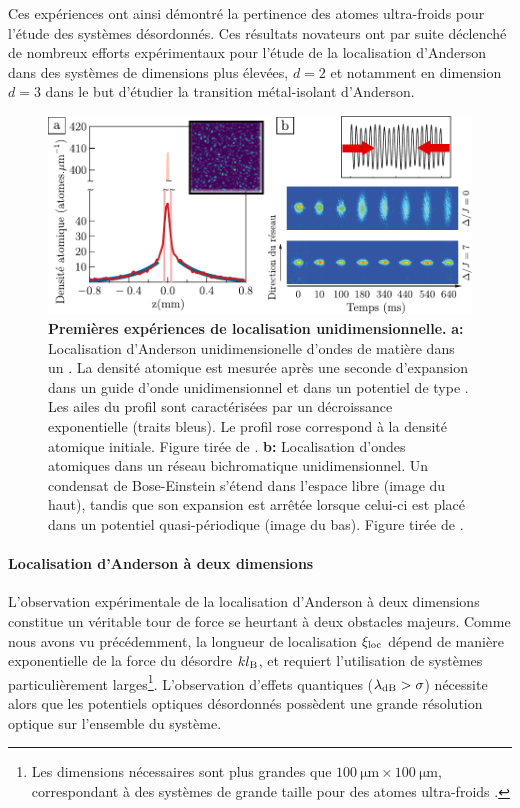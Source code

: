Ces expériences ont ainsi démontré la pertinence des atomes ultra-froids pour l'étude des systèmes désordonnés. Ces résultats novateurs ont par suite déclenché de nombreux efforts expérimentaux pour l'étude de la localisation d'Anderson dans des systèmes de dimensions plus élevées, $d=2$ et notamment en dimension $d=3$ dans le but d'étudier la transition métal-isolant d'Anderson. 

\begin{figure}
\centering
\includegraphics[width=\textwidth]{Fig/Localisation/localisation_1D_atomes.pdf}
\caption{\textbf{Premières expériences de localisation unidimensionnelle.} \textbf{a:} Localisation d'Anderson unidimensionelle d'ondes de matière dans un \speckle . La densité atomique est mesurée après une seconde d'expansion dans un guide d'onde unidimensionnel et dans un potentiel de type \speckle . Les ailes du profil sont caractérisées par un décroissance exponentielle (traits bleus). Le profil rose correspond à la densité atomique initiale. Figure tirée de \citep{billy2008direct}. \textbf{b:} Localisation d'ondes atomiques dans un réseau bichromatique unidimensionnel. Un condensat de Bose-Einstein s'étend dans l'espace libre (image du haut), tandis que son expansion est arrêtée lorsque celui-ci est placé dans un potentiel quasi-périodique (image du bas). Figure tirée de \citep{roati2008anderson}. }
\label{fig:localisation_1D_atomes_froids}
\end{figure}

\paragraph*{Localisation d'Anderson à deux dimensions}
L'observation expérimentale de la localisation d'Anderson à deux dimensions constitue un véritable tour de force se heurtant à deux obstacles majeurs. Comme nous avons vu précédemment, la longueur de localisation $\xi_{\mathrm{loc}}$ dépend de manière exponentielle de la force du désordre $kl_{\mathrm{B}}$, et requiert l'utilisation de systèmes particulièrement larges\footnote{Les dimensions nécessaires sont plus grandes que $\SI{100}{\micro\metre}\times\SI{100}{\micro\metre}$, correspondant à des systèmes de grande taille pour des atomes ultra-froids \citep{white2019observation}.}. L'observation d'effets quantiques ($\lambda_{\mathrm{dB}}>\sigma$) nécessite alors que les potentiels optiques désordonnés possèdent une grande résolution optique sur l'ensemble du système.


